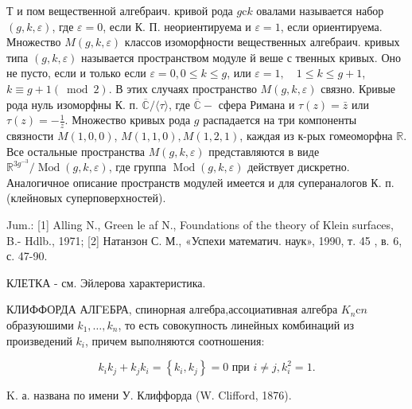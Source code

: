 \documentclass[10pt]{article}
\begin{document}
Т и пом вещественной алгебраич. кривой рода $g \mathrm{c} k$ овалами называется набор $(g, k, \varepsilon)$, где $\varepsilon=0$, если К. П. неориентируема и $\varepsilon=1$, если ориентируема. Множество $M(g, k, \varepsilon)$ классов изоморфности вещественных алгебраич. кривых типа $(g, k, \varepsilon)$ называется пространством модуле й веше с твенных кривых. Оно не пусто, если и только если $\varepsilon=0,0 \leqslant k \leqslant g$, или $\varepsilon=1, \quad 1 \leqslant k \leqslant g+1$, $k \equiv g+1(\bmod 2)$. В этих случаях пространство $M(g, k, \varepsilon)$ связно. Кривые рода нуль изоморфны К. п. $\overline{\mathbb{C}} /\langle\tau\rangle$, где $\overline{\mathbb{C}}-$ сфера Римана и $\tau(z)=\bar{z}$ или $\tau(z)=-\frac{1}{z}$. Множество кривых рода $g$ распадается на три компоненты связности $M(1,0,0)$, $M(1,1,0), M(1,2,1)$, каждая из к-рых гомеоморфна $\mathbb{R}$. Все остальные пространства $M(g, k, \varepsilon)$ представляются в виде $\mathbb{R}^{3 g^{-3}} / \operatorname{Mod}(g, k, \varepsilon)$, где группа $\operatorname{Mod}(g, k, \varepsilon)$ действует дискретно. Аналогичное описание пространств модулей имеется и для супераналогов К. п. (клейновых суперповерхностей).



Jum.: [1] Alling N., Green le af N., Foundations of the theory of Klein surfaces, B.- Hdlb., 1971; [2] Натанзон С. М., «Успехи математич. наук», 1990, т. 45 , в. 6, с. 47-90.



КЛЕТКА - см. Эйлерова характеристика.



КЛИФФОРДА АЛГEБРА, спинорная алгебра,ассоциативная алгебра $K_{n} \mathrm{c} n$ образуюшими $k_{1}, \ldots, k_{n}$, то есть совокупность линейных комбинаций из произведений $k_{i}$, причем выполняются соотношения:



\[

k_{i} k_{j}+k_{j} k_{i}=\left\{k_{i}, k_{j}\right\}=0 \text { при } i \neq j, k_{i}^{2}=1 .

\]



K. а. названа по имени У. Клиффорда (W. Clifford, 1876).
\end{document}
